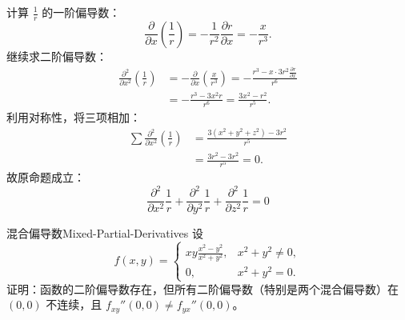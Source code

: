 \begin{myproof}
    计算 $\frac{1}{r}$ 的一阶偏导数：
    \begin{equation}
        \frac{\partial}{\partial x} \left( \frac{1}{r} \right) = -\frac{1}{r^2} \frac{\partial r}{\partial x} = -\frac{x}{r^3}.
    \end{equation}
    继续求二阶偏导数：
    \begin{equation}
        \begin{aligned}
            \frac{\partial^2}{\partial x^2} \left( \frac{1}{r} \right) & = -\frac{\partial}{\partial x} \left( \frac{x}{r^3} \right) = -\frac{r^3 - x \cdot 3r^2 \frac{\partial r}{\partial x}}{r^6} \\
                                                                       & = -\frac{r^3 - 3x^2 r}{r^6} = \frac{3x^2 - r^2}{r^5}.
        \end{aligned}
    \end{equation}
    利用对称性，将三项相加：
    \begin{equation}
        \begin{aligned}
            \sum \frac{\partial^2}{\partial x^2} \left( \frac{1}{r} \right) & = \frac{3(x^2 + y^2 + z^2) - 3r^2}{r^5} \\
                                                                            & = \frac{3r^2 - 3r^2}{r^5} = 0.
        \end{aligned}
    \end{equation}
    故原命题成立：
    \begin{equation}
        \boxed{\frac{\partial^2}{\partial x^2} \frac{1}{r} + \frac{\partial^2}{\partial y^2} \frac{1}{r} + \frac{\partial^2}{\partial z^2} \frac{1}{r} = 0}
    \end{equation}
\end{myproof}


\begin{problem}{混合偏导数}{Mixed-Partial-Derivatives}
    设
    \begin{equation}
        f(x, y) = \begin{cases} xy \frac{x^2 - y^2}{x^2 + y^2}, & x^2 + y^2 \neq 0, \\ 0, & x^2 + y^2 = 0. \end{cases}
    \end{equation}
    证明：函数的二阶偏导数存在，但所有二阶偏导数（特别是两个混合偏导数）在 $(0, 0)$ 不连续，且 $f_{xy}''(0, 0) \neq f_{yx}''(0, 0)$。
\end{problem}

